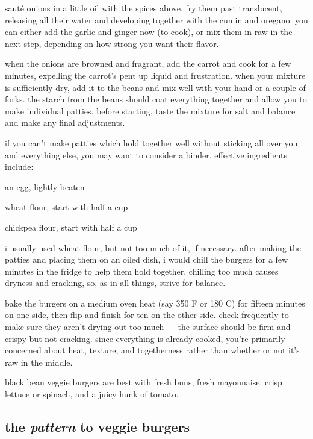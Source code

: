 saut\'{e} onions in a little oil with the spices above. fry them past 
translucent, releasing all their water and developing together with the cumin 
and oregano. you can either add the garlic and ginger now (to cook), or mix 
them in raw in the next step, depending on how strong you want their flavor.

when the onions are browned and fragrant, add the carrot and cook for a few 
minutes, expelling the carrot's pent up liquid and frustration. when your 
mixture is sufficiently dry, add it to the beans and mix well with your hand 
or a couple of forks. the starch from the beans should coat everything 
together and allow you to make individual patties. before starting, taste the 
mixture for salt and balance and make any final adjustments.

if you can't make patties which hold together well without sticking all over 
you and everything else, you may want to consider a binder. effective 
ingredients include:

\begin{ingredients}
  \item an egg, lightly beaten
  \item wheat flour, start with half a cup
  \item chickpea flour, start with half a cup
\end{ingredients}

i usually used wheat flour, but not too much of it, if necessary. after making 
the patties and placing them on an oiled dish, i would chill the burgers for a 
few minutes in the fridge to help them hold together. chilling too much causes 
dryness and cracking, so, as in all things, strive for balance.

bake the burgers on a medium oven heat (say 350 F or 180 C) for fifteen 
minutes on one side, then flip and finish for ten on the other side. check 
frequently to make sure they aren't drying out too much --- the surface should 
be firm and crispy but not cracking. since everything is already cooked, 
you're primarily concerned about heat, texture, and togetherness rather than 
whether or not it's raw in the middle.

black bean veggie burgers are best with fresh buns, fresh mayonnaise, crisp 
lettuce or spinach, and a juicy hunk of tomato.

\subsection{the \textit{pattern} to veggie burgers}

